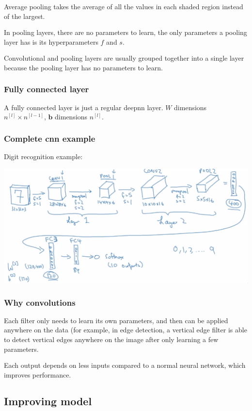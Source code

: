 \documentclass[12pt]{article}
\begin{document}
Average pooling takes the average of all the values in each shaded region instead of the
largest.

In pooling layers, there are no parameters to learn, the only parameters a pooling layer
has is its hyperparameters $f$ and $s$.

Convolutional and pooling layers are usually grouped together into a single layer because
the pooling layer has no parameters to learn.

\subsubsection{Fully connected layer}

A fully connected layer is just a regular deepnn layer. $W$ dimensions $n^{[l]} \times n^{[l-1]}$,
$\bm b$ dimensions $n^{[l]}$.

\subsubsection{Complete cnn example}

Digit recognition example:

\includegraphics[scale=.4]{images/cnn-example.png}

\subsubsection{Why convolutions}

Each filter only needs to learn its own parameters, and then can be applied anywhere on the
data (for example, in edge detection, a vertical edge filter is able to detect vertical edges
anywhere on the image after only learning a few parameters.

Each output depends on less inputs compared to a normal neural network, which improves
performance.

\subsection{Improving model}
\end{document}
